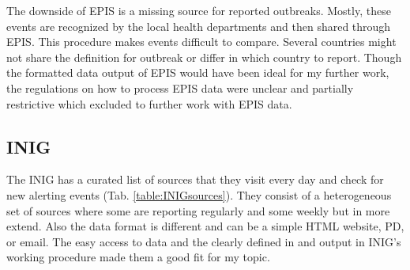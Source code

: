 The downside of EPIS is a missing source for reported outbreaks. Mostly, these events are recognized by the local health departments and then shared through EPIS. This procedure makes events difficult to compare. Several countries might not share the definition for outbreak or differ in which country to report.
Though the formatted data output of EPIS would have been ideal for my further work, the regulations on how to process EPIS data were unclear and partially restrictive which excluded to further work with EPIS data.

\subsection{INIG}\label{INIGsources}
The INIG has a curated list of sources that they visit every day and check for new alerting events (Tab. \ref{table:INIGsources}).
They consist of a heterogeneous set of sources where some are reporting regularly and some weekly but in more extend. Also the data format is different and can be a simple HTML website, PD, or email.
The easy access to data and the clearly defined in and output in INIG's working procedure made them a good fit for my topic.
